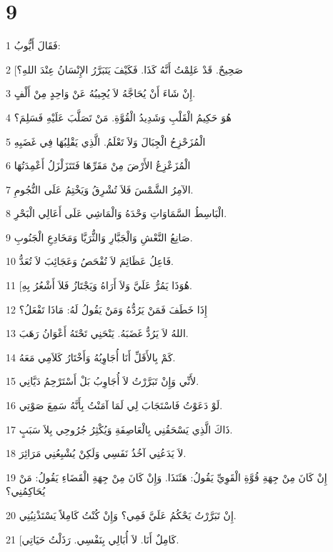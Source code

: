 \chapter{9}

\par 1 فَقَالَ أَيُّوبُ:
\par 2 [صَحِيحٌ. قَدْ عَلِمْتُ أَنَّهُ كَذَا. فَكَيْفَ يَتَبَرَّرُ الإِنْسَانُ عِنْدَ اللهِ؟
\par 3 إِنْ شَاءَ أَنْ يُحَاجَّهُ لاَ يُجِيبُهُ عَنْ وَاحِدٍ مِنْ أَلْفٍ.
\par 4 هُوَ حَكِيمُ الْقَلْبِ وَشَدِيدُ الْقُوَّةِ. مَنْ تَصَلَّبَ عَلَيْهِ فَسَلِمَ؟
\par 5 الْمُزَحْزِحُ الْجِبَالَ وَلاَ تَعْلَمُ. الَّذِي يَقْلِبُهَا فِي غَضَبِهِ
\par 6 الْمُزَعْزِعُ الأَرْضَ مِنْ مَقَرِّهَا فَتَتَزَلْزَلُ أَعْمِدَتُهَا
\par 7 الآمِرُ الشَّمْسَ فَلاَ تُشْرِقُ وَيَخْتِمُ عَلَى النُّجُومِ.
\par 8 الْبَاسِطُ السَّمَاوَاتِ وَحْدَهُ وَالْمَاشِي عَلَى أَعَالِي الْبَحْرِ.
\par 9 صَانِعُ النَّعْشِ وَالْجَبَّارِ وَالثُّرَيَّا وَمَخَادِعِ الْجَنُوبِ.
\par 10 فَاعِلُ عَظَائِمَ لاَ تُفْحَصُ وَعَجَائِبَ لاَ تُعَدُّ.
\par 11 [هُوَذَا يَمُرُّ عَلَيَّ وَلاَ أَرَاهُ وَيَجْتَازُ فَلاَ أَشْعُرُ بِهِ.
\par 12 إِذَا خَطَفَ فَمَنْ يَرُدُّهُ وَمَنْ يَقُولُ لَهُ: مَاذَا تَفْعَلُ؟
\par 13 اللهُ لاَ يَرُدُّ غَضَبَهُ. يَنْحَنِي تَحْتَهُ أَعْوَانُ رَهَبَ.
\par 14 كَمْ بِالأَقَلِّ أَنَا أُجَاوِبُهُ وَأَخْتَارُ كَلاَمِي مَعَهُ.
\par 15 لأَنِّي وَإِنْ تَبَرَّرْتُ لاَ أُجَاوِبُ بَلْ أَسْتَرْحِمُ دَيَّانِي.
\par 16 لَوْ دَعَوْتُ فَاسْتَجَابَ لِي لَمَا آمَنْتُ بِأَنَّهُ سَمِعَ صَوْتِي.
\par 17 ذَاكَ الَّذِي يَسْحَقُنِي بِالْعَاصِفَةِ وَيُكْثِرُ جُرُوحِي بِلاَ سَبَبٍ.
\par 18 لاَ يَدَعُنِي آخُذُ نَفَسِي وَلَكِنْ يُشْبِعُنِي مَرَائِرَ.
\par 19 إِنْ كَانَ مِنْ جِهَةِ قُوَّةِ الْقَوِيِّ يَقُولُ: هَئَنَذَا. وَإِنْ كَانَ مِنْ جِهَةِ الْقَضَاءِ يَقُولُ: مَنْ يُحَاكِمُنِي؟
\par 20 إِنْ تَبَرَّرْتُ يَحْكُمُ عَلَيَّ فَمِي؟ وَإِنْ كُنْتُ كَامِلاً يَسْتَذْنِبُنِي.
\par 21 [كَامِلٌ أَنَا. لاَ أُبَالِي بِنَفْسِي. رَذَلْتُ حَيَاتِي.
